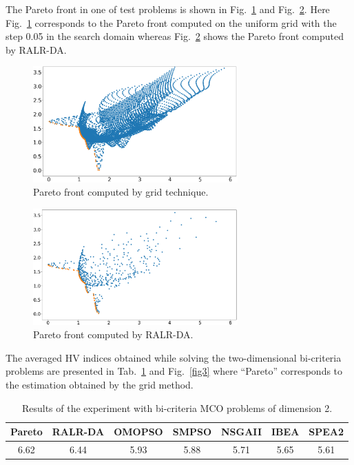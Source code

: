 \documentclass[runningheads]{llncs}
\begin{document}
The Pareto front in one of test problems is shown in Fig.~\ref{fig2a} and Fig.~\ref{fig2b}. Here Fig.~\ref{fig2a} corresponds to the Pareto front computed on the uniform grid with the step 0.05 in the search domain whereas Fig.~\ref{fig2b} shows the Pareto front computed by RALR-DA.

\begin{figure}
\centering
\includegraphics[width=0.7\textwidth]{fig2a.png} 
\caption{Pareto front computed by grid technique.}\label{fig2a} 
\end{figure}

\begin{figure}
\centering
\includegraphics[width=0.7\textwidth]{fig2b.png} 
\caption{Pareto front computed by RALR-DA.}\label{fig2b} 
\end{figure}


The averaged HV indices obtained while solving the two-dimensional bi-criteria problems are presented in Tab.~\ref{tab1} and Fig.~\ref{fig3} where ``Pareto'' corresponds to the estimation obtained by the grid method.

\begin{table}
\caption{Results of the experiment with bi-criteria MCO problems of dimension 2.}
\centering
\begin{tabular}{ccccccc} \hline
 Pareto & RALR-DA & OMOPSO & SMPSO & NSGAII & IBEA & SPEA2 \\ \hline
  6.62 & 6.44 & 5.93 & 5.88 & 5.71 & 5.65 & 5.61 \\ \hline
\end{tabular}
\label{tab1}
\end{table}
\end{document}
